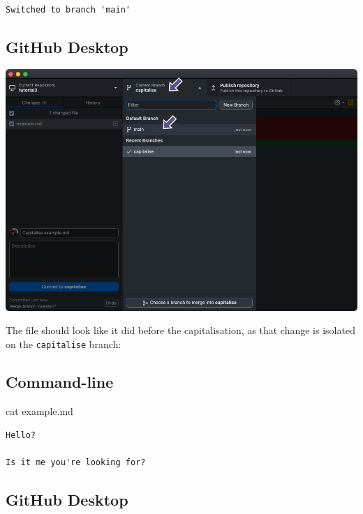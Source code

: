 \documentclass[
  letterpaper,
  DIV=11,
  numbers=noendperiod]{scrartcl}
\newenvironment{Shaded}{\begin{snugshade}}{\end{snugshade}}
\newcommand{\FunctionTok}[1]{\textcolor[rgb]{0.28,0.35,0.67}{#1}}
\newcommand{\NormalTok}[1]{\textcolor[rgb]{0.00,0.23,0.31}{#1}}
\begin{document}
\begin{verbatim}

Switched to branch 'main'
\end{verbatim}

\subsection{GitHub Desktop}

\includegraphics{images/image48.png}

The file should look like it did before the capitalisation, as that
change is isolated on the \texttt{capitalise} branch:

\subsection{Command-line}

\begin{Shaded}
\begin{Highlighting}[]
\FunctionTok{cat}\NormalTok{ example.md}
\end{Highlighting}
\end{Shaded}

\begin{verbatim}
Hello?

Is it me you're looking for?
\end{verbatim}

\subsection{GitHub Desktop}
\end{document}
